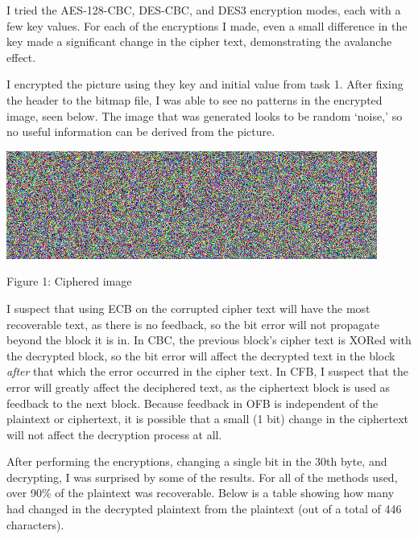 \documentclass[12pt,largemargins]{homework}
\begin{document}
\maketitle

I tried the AES-128-CBC, DES-CBC, and DES3 encryption modes, each with a few
key values. For each of the encryptions I made, even a small difference in the
key made a significant change in the cipher text, demonstrating the avalanche
effect.

I encrypted the picture using they key and initial value from task 1. After
fixing the header to the bitmap file, I was able to see no patterns in the
encrypted image, seen below. The image that was generated looks to be
random `noise,' so no useful information can be derived from the picture.

\begin{center}
    \includegraphics[width=.5\textwidth]{pic_ciphered.jpg}

    Figure 1: Ciphered image
\end{center}

I suspect that using ECB on the corrupted cipher text will have the most
recoverable text, as there is no feedback, so the bit error will not propagate
beyond the block it is in. In CBC, the previous block's cipher text is XORed
with the decrypted block, so the bit error will affect the decrypted text in
the block \emph{after} that which the error occurred in the cipher text. In
CFB, I suspect that the error will greatly affect the deciphered text, as the
ciphertext block is used as feedback to the next block. Because feedback in OFB
is independent of the plaintext or ciphertext, it is possible that a small (1
bit) change in the ciphertext will not affect the decryption process at all.

After performing the encryptions, changing a single bit in the 30th byte, and
decrypting, I was surprised by some of the results. For all of the methods
used, over 90\% of the plaintext was recoverable. Below is a table showing how
many had changed in the decrypted plaintext from the plaintext (out of a
total of 446 characters).
\end{document}
